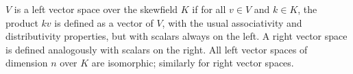 $V$ is a left vector space over the skewfield $K$ if for all $v \in V$ and $k \in K$, the product $kv$ is defined as a vector of $V$, with the usual associativity and distributivity properties, but with scalars always on the left. A right vector space is defined analogously with scalars on the right. All left vector spaces of dimension $n$ over $K$ are isomorphic; similarly for right vector spaces.
